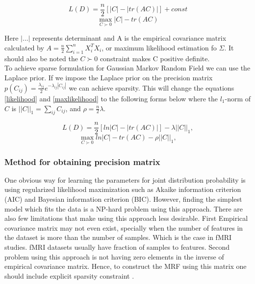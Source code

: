 \documentclass{article} %
\begin{document}
\begin{multicols}{2}
\begin{equation}\label{likelihood}
L(D) = \frac{n}{2} [|C| -  |tr(AC)|] + const
\end{equation}\break
\begin{equation}\label{maxlikelihood}
\max_{C\succ0} |C| - tr(AC)
\end{equation}
\end{multicols}

Here $|...|$ represents determinant and A is the empirical covariance 
matrix calculated by $A = \frac{n}{2} \sum_{i=1}^{n} X_i^T X_i$, or 
maximum likelihood estimation fo $\Sigma$. It should also be noted 
the $C\succ0$ constraint makes C positive definite.\\

To achieve sparse formulation for Gaussian Markov Random Field we can use 
the Laplace prior. If we impose the Laplace prior on the precision matrix 
$p(C_{ij}) = \frac{\lambda_{ij}}{2} e^{-\lambda_{ij}|C_{ij}|} $ we can 
achieve sparsity. This will change the equations \eqref{likelihood} and 
\eqref{maxlikelihood} to the following forms below where the $l_{1}$-norm 
of $C$ is $||C||_{1}= \sum_{ij}C_{ij}$, and $\rho=\frac{n}{2}\lambda$.

\begin{multicols}{2}
\begin{equation}\label{loglikelihood}
L(D) = \frac{n}{2} [ln|C| -  |tr(AC)|] - \lambda||C||_{1}, 
\end{equation}\break
\begin{equation}\label{logmaxlikelihood}
\max_{C\succ0} ln|C| - tr(AC) - \rho||C||_{1},
\end{equation}
\end{multicols}


\subsubsection{Method for obtaining precision matrix}  
One obvious way for learning the parameters for joint distribution probability 
is using regularized likelihood maximization such as Akaike information criterion (AIC) and Bayesian information criterion (BIC). However, 
finding the simplest model which fits the data is a NP-hard problem using this 
approach. There are also few limitations that make using this approach less 
desirable. First Empirical covariance matrix may not even exist, specially when 
the number of features in the dataset is more than the number of samples. Which 
is the case in fMRI studies. fMRI datasets usually have fraction of samples to 
features. Second problem using this approach is not having zero elements in the 
inverse of empirical covariance matrix. Hence, to construct the MRF using this 
matrix one should include explicit sparsity constraint \cite{Rish2014Book}. \\
\end{document}

